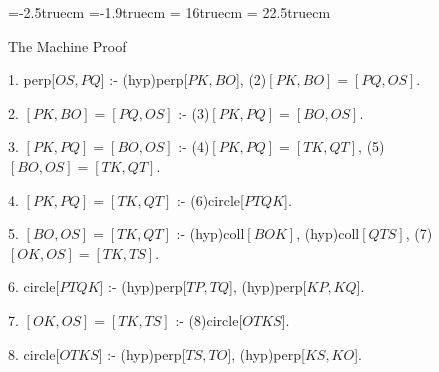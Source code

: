 \voffset=-2.5truecm
\hoffset=-1.9truecm
\textwidth = 16truecm
\textheight = 22.5truecm
\parskip=8pt
\parindent=15pt
\def\fa#1#2{\langle{#1},{#2}\rangle}


{\vskip6pt \parskip=6pt \parindent=10pt 
The Machine Proof


1. perp[$OS,PQ$] :- (hyp)perp[$PK,BO$], (2)$[PK,BO]=[PQ,OS]$.

2. $[PK,BO]=[PQ,OS]$ :- (3)$[PK,PQ]=[BO,OS]$.

3. $[PK,PQ]=[BO,OS]$ :- (4)$[PK,PQ]=[TK,QT]$, (5)$[BO,OS]=[TK,QT]$.

4. $[PK,PQ]=[TK,QT]$ :- (6)circle[$PTQK$].

5. $[BO,OS]=[TK,QT]$ :- (hyp)coll$[BOK]$, (hyp)coll$[QTS]$, (7)$[OK,OS]=[TK,TS]$.

6. circle[$PTQK$] :- (hyp)perp[$TP,TQ$], (hyp)perp[$KP,KQ$].

7. $[OK,OS]=[TK,TS]$ :- (8)circle[$OTKS$].

8. circle[$OTKS$] :- (hyp)perp[$TS,TO$], (hyp)perp[$KS,KO$].
}

